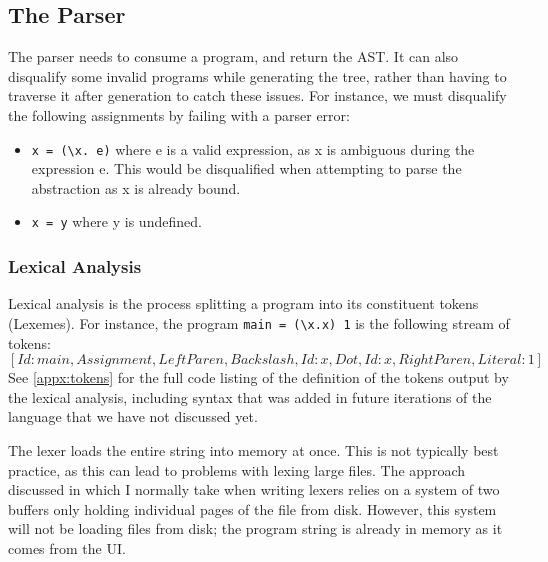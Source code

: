 

\subsection{The Parser}
The parser needs to consume a program, and return the \ac{AST}. It can also disqualify some invalid programs while generating the tree, rather than having to traverse it after generation to catch these issues. For instance, we must disqualify the following assignments by failing with a parser error:
\begin{itemize}
    \item \verb|x = (\x. e)| where e is a valid expression, as x is ambiguous during the expression e. This would be disqualified when attempting to parse the abstraction as x is already bound.  
    \item \verb|x = y| where y is undefined.
\end{itemize}


\subsubsection{Lexical Analysis}
Lexical analysis is the process splitting a program into its constituent tokens (Lexemes). For instance, the program \verb|main = (\x.x) 1| is the following stream of tokens: \[[Id: main, Assignment, LeftParen, Backslash, Id: x, Dot, Id: x, RightParen, Literal: 1]\]
See \ref{appx:tokens} for the full code listing of the definition of the tokens output by the lexical analysis, including syntax that was added in future iterations of the language that we have not discussed yet.

The lexer loads the entire string into memory at once. This is not typically best practice, as this can lead to problems with lexing large files. The approach discussed in \cite{dragon_book} which I normally take when writing lexers relies on a system of two buffers only holding individual pages of the file from disk. However, this system will not be loading files from disk; the program string is already in memory as it comes from the UI. 

